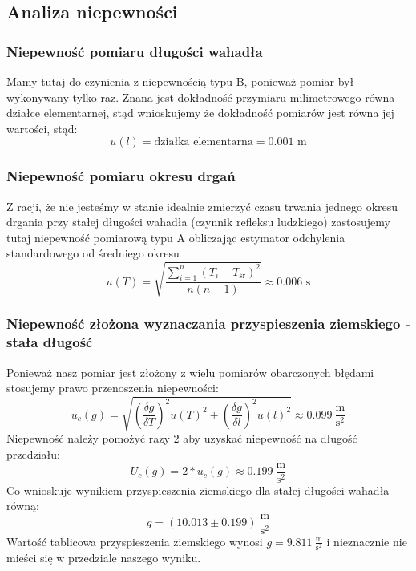 \documentclass[a4paper,12pts]{article}
\begin{document}
	
	\subsection{Analiza niepewności}
	\label{analiza_niepewnosci}
	
	\subsubsection{Niepewność pomiaru długości wahadła}
	Mamy tutaj do czynienia z niepewnością typu B, ponieważ pomiar był wykonywany tylko raz. Znana jest dokładność przymiaru milimetrowego równa działce elementarnej, stąd wnioskujemy że dokładność pomiarów jest równa jej wartości, stąd:
	\begin{equation}
		u(l) = \textrm{działka elementarna} = 0.001 \textrm{ m}
	\end{equation}
	
	\subsubsection{Niepewność pomiaru okresu drgań}
	Z racji, że nie jesteśmy w stanie idealnie zmierzyć czasu trwania jednego okresu drgania przy stałej długości wahadła (czynnik refleksu ludzkiego) zastosujemy tutaj niepewność pomiarową typu A obliczając estymator odchylenia standardowego od średniego okresu
	\begin{equation}
		u(T) = \sqrt{\frac{\sum_{i=1}^{n}(T_i - T_{\textrm{śr}})^2}{n(n-1)}} \approx 0.006 \textrm{ s}
	\end{equation}
	
	\subsubsection{Niepewność złożona wyznaczania przyspieszenia ziemskiego - stała długość}
	Ponieważ nasz pomiar jest złożony z wielu pomiarów obarczonych błędami stosujemy prawo przenoszenia niepewności:
	\begin{equation}
		u_c(g) = \sqrt{\left(\frac{\delta g}{\delta T}\right)^2 u(T)^2 + \left(\frac{\delta g}{\delta l}\right)^2 u(l)^2} \approx 0.099 ~\frac{\textrm{m}}{\textrm{s}^2}
	\end{equation}
	Niepewność należy pomożyć razy $2$ aby uzyskać niepewność na długość przedziału:
	\begin{equation}
	U_c(g) = 2 * u_c(g) \approx 0.199 ~\frac{\textrm{m}}{\textrm{s}^2}
	\end{equation}
	Co wnioskuje wynikiem przyspieszenia ziemskiego dla stałej długości wahadła równą:
	$$ g = (10.013 \pm 0.199) ~\frac{\textrm{m}}{\textrm{s}^2} $$
	Wartość tablicowa przyspieszenia ziemskiego wynosi $g = 9.811 ~\frac{\textrm{m}}{\textrm{s}^2}$ i nieznacznie nie mieści się w przedziale naszego wyniku.
	
\end{document}
